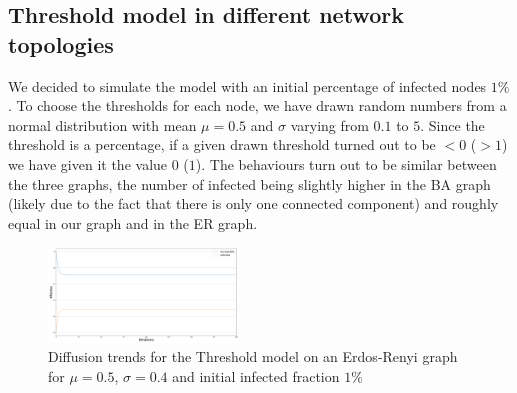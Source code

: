 \documentclass[sigchi]{acmart}
\begin{document}
\subsection{Threshold model in different network topologies}
We decided to simulate the model with an initial percentage of infected nodes $1\%$. To choose the thresholds for each node, we have drawn random numbers from a normal distribution with mean $\mu = 0.5$ and $\sigma$ varying from $0.1$ to $5$. Since the threshold is a percentage, if a given drawn threshold turned out to be $<0$ ($>1$) we have given it the value $0$ ($1$). The behaviours turn out to be similar between the three graphs, the number of infected being slightly higher in the BA graph (likely due to the fact that there is only one connected component) and roughly equal in our graph and in the ER graph.

\begin{figure}[!htbp]
    \centering
    \includegraphics[width=0.45\textwidth]{img/Threshold/diffusionERThreshold_fraction=0.01_mu0.5_sigma=0.4.png}
    \caption{Diffusion trends for the Threshold model on an Erdos-Renyi graph for $\mu = 0.5$, $\sigma = 0.4$ and initial infected fraction $1\%$}
    \label{fig:my_label}
\end{figure}
\end{document}
